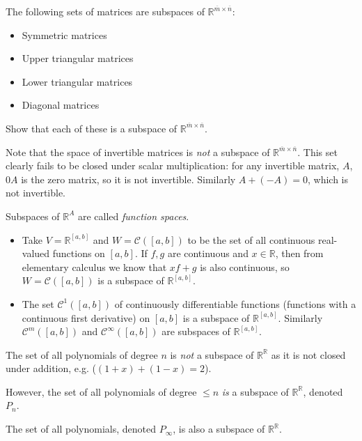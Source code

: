 \documentclass[12pt,letterpaper,reqno]{article}
\numberwithin{equation}{section}
\newcommand{\ti}[1]{\textit{#1}}
\begin{document}
\begin{example}
The following sets of matrices are subspaces of $\mathbb{R}^{\overline{m} \times \overline{n}}$:
\begin{itemize}
	\item Symmetric matrices
	\item Upper triangular matrices
	\item Lower triangular matrices
	\item Diagonal matrices
\end{itemize}
\begin{exercise}
Show that each of these is a subspace of $\mathbb{R}^{\overline{m} \times \overline{n}}$.	
\end{exercise}

Note that the space of invertible matrices is \emph{not} a subspace of $\mathbb{R}^{\overline{m} \times \overline{n}}$. This set clearly fails to be closed under scalar multiplication: for any invertible matrix, $A$, $0A$ is the zero matrix, so it is not invertible. Similarly $A+(-A)=0$, which is not invertible.
\end{example}

\begin{example}
	Subspaces of $\mathbb{R}^A$ are called \emph{function spaces}.
	\begin{itemize}
	\item Take $V=\mathbb{R}^{[a,b]}$ and $W=\mathscr{C}([a,b])$ to be the set of all continuous real-valued functions on $[a,b]$. If $f,g$ are continuous and $x \in \mathbb{R}$, then from elementary calculus we know that $xf+g$ is also continuous, so $W=\mathscr{C}([a,b])$ is a subspace of $\mathbb{R}^{[a,b]}$.
	\item The set $\mathscr{C}^1([a,b])$ of continuously differentiable functions (functions with a continuous first derivative) on $[a,b]$ is a subspace of $\mathbb{R}^{[a,b]}$. Similarly $\mathscr{C}^m([a,b])$ and $\mathscr{C}^\infty([a,b])$ are subspaces of $\mathbb{R}^{[a,b]}$.
\end{itemize}
\end{example}

\begin{example}[Polynomials]
	The set of all polynomials of degree $n$ is \emph{not} a subspace of $\mathbb{R}^\mathbb{R}$ as it is not closed under addition, e.g. ($(1+x)+(1-x)=2$). 
	
However, the set of all polynomials of degree $\leq n$ \ti{is} a subspace of $\mathbb{R}^\mathbb{R}$, denoted $P_n$. 

The set of all polynomials, denoted $P_\infty$, is also a subspace of $\mathbb{R}^\mathbb{R}$.
\end{example}
\end{document}
